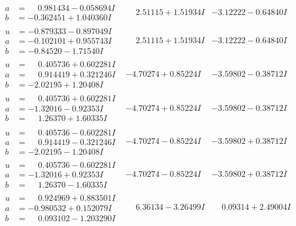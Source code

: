 \documentclass[1p]{elsarticle_modified}
\theoremstyle{definition}
\begin{document}
$$\begin{array}{c|c|c}
\begin{aligned}
a &= \phantom{-}0.981434 - 0.058694 I \\
b &= -0.362451 + 1.040360 I\end{aligned}
 & \phantom{-}2.51115 + 1.51934 I & -3.12222 - 0.64840 I \\ \hline\begin{aligned}
u &= -0.879333 - 0.897049 I \\
a &= -0.102101 + 0.955743 I \\
b &= -0.84520 - 1.71540 I\end{aligned}
 & \phantom{-}2.51115 + 1.51934 I & -3.12222 - 0.64840 I \\ \hline\begin{aligned}
u &= \phantom{-}0.405736 + 0.602281 I \\
a &= \phantom{-}0.914419 + 0.321246 I \\
b &= -2.02195 + 1.20408 I\end{aligned}
 & -4.70274 + 0.85224 I & -3.59802 - 0.38712 I \\ \hline\begin{aligned}
u &= \phantom{-}0.405736 + 0.602281 I \\
a &= -1.32016 - 0.92353 I \\
b &= \phantom{-}1.26370 + 1.60335 I\end{aligned}
 & -4.70274 + 0.85224 I & -3.59802 - 0.38712 I \\ \hline\begin{aligned}
u &= \phantom{-}0.405736 - 0.602281 I \\
a &= \phantom{-}0.914419 - 0.321246 I \\
b &= -2.02195 - 1.20408 I\end{aligned}
 & -4.70274 - 0.85224 I & -3.59802 + 0.38712 I \\ \hline\begin{aligned}
u &= \phantom{-}0.405736 - 0.602281 I \\
a &= -1.32016 + 0.92353 I \\
b &= \phantom{-}1.26370 - 1.60335 I\end{aligned}
 & -4.70274 - 0.85224 I & -3.59802 + 0.38712 I \\ \hline\begin{aligned}
u &= \phantom{-}0.924969 + 0.883501 I \\
a &= -0.980532 + 0.152079 I \\
b &= \phantom{-}0.093102 - 1.203290 I\end{aligned}
 & \phantom{-}6.36134 - 3.26499 I & \phantom{-}0.09314 + 2.49004 I \\ \hline\begin{aligned}

\end{aligned}
\end{array}$$
\end{document}
